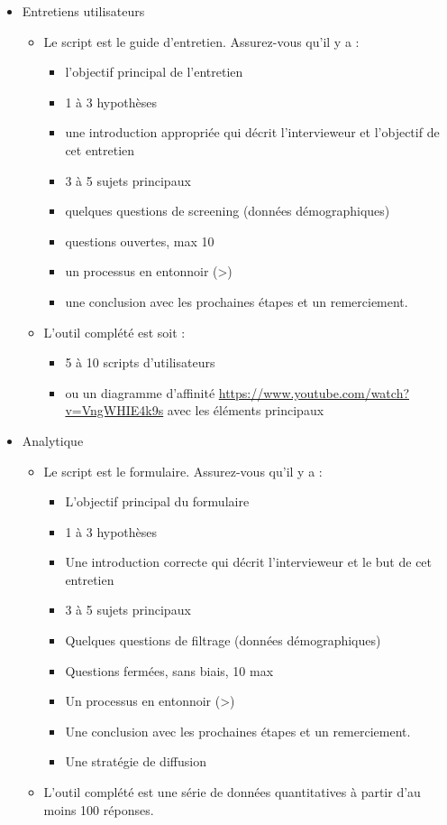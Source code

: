 \begin{itemize}
\item Entretiens utilisateurs
\begin{itemize}
\item Le script est le guide d'entretien. Assurez-vous qu'il y a :
\begin{itemize}
\item l'objectif principal de l'entretien
\item 1 à 3 hypothèses
\item une introduction appropriée qui décrit l'intervieweur et l'objectif de cet entretien
\item 3 à 5 sujets principaux
\item quelques questions de screening (données démographiques)
\item questions ouvertes, max 10
\item un processus en entonnoir (>)
\item une conclusion avec les prochaines étapes et un remerciement.
\end{itemize}
\item L'outil complété est soit :
\begin{itemize}
\item 5 à 10 scripts d'utilisateurs
\item ou un diagramme d'affinité \url{https://www.youtube.com/watch?v=VngWHIE4k9s} avec les éléments principaux
\end{itemize}
\end{itemize}
\end{itemize}

\begin{itemize}
\item Analytique
\begin{itemize}
\item Le script est le formulaire. Assurez-vous qu'il y a :
\begin{itemize}
\item L'objectif principal du formulaire
\item 1 à 3 hypothèses
\item Une introduction correcte qui décrit l'intervieweur et le but de cet entretien
\item 3 à 5 sujets principaux
\item Quelques questions de filtrage (données démographiques)
\item Questions fermées, sans biais, 10 max
\item Un processus en entonnoir (>)
\item Une conclusion avec les prochaines étapes et un remerciement.
\item Une stratégie de diffusion
\end{itemize}
\item L'outil complété est une série de données quantitatives à partir d'au moins 100 réponses.
\end{itemize}
\end{itemize}

